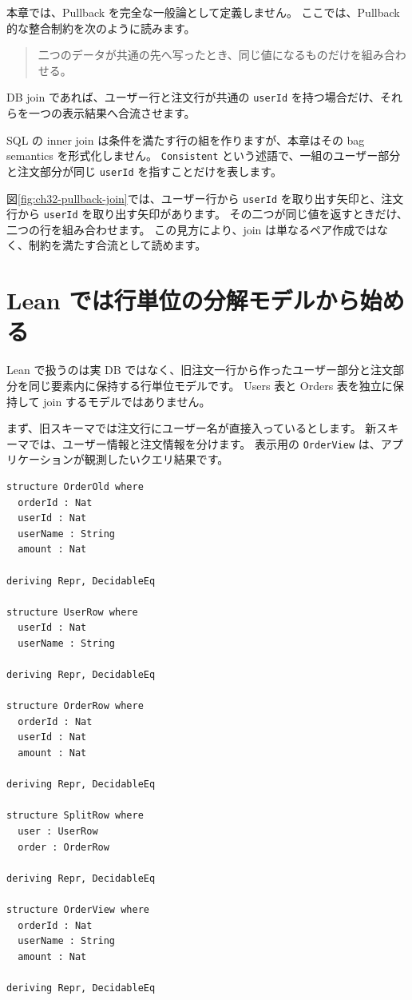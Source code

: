 本章では、Pullback を完全な一般論として定義しません。
ここでは、Pullback 的な整合制約を次のように読みます。
\begin{quote}
二つのデータが共通の先へ写ったとき、同じ値になるものだけを組み合わせる。
\end{quote}
DB join であれば、ユーザー行と注文行が共通の \texttt{userId} を持つ場合だけ、それらを一つの表示結果へ合流させます。

SQL の inner join は条件を満たす行の組を作りますが、本章はその bag semantics を形式化しません。
\texttt{Consistent} という述語で、一組のユーザー部分と注文部分が同じ \texttt{userId} を指すことだけを表します。


図\ref{fig:ch32-pullback-join}では、ユーザー行から \texttt{userId} を取り出す矢印と、注文行から \texttt{userId} を取り出す矢印があります。
その二つが同じ値を返すときだけ、二つの行を組み合わせます。
この見方により、join は単なるペア作成ではなく、制約を満たす合流として読めます。

\section{Lean では行単位の分解モデルから始める}

Lean で扱うのは実 DB ではなく、旧注文一行から作ったユーザー部分と注文部分を同じ要素内に保持する行単位モデルです。
Users 表と Orders 表を独立に保持して join するモデルではありません。

まず、旧スキーマでは注文行にユーザー名が直接入っているとします。
新スキーマでは、ユーザー情報と注文情報を分けます。
表示用の \texttt{OrderView} は、アプリケーションが観測したいクエリ結果です。

\begin{listing}[htbp]
\begin{verbatim}
structure OrderOld where
  orderId : Nat
  userId : Nat
  userName : String
  amount : Nat

deriving Repr, DecidableEq

structure UserRow where
  userId : Nat
  userName : String

deriving Repr, DecidableEq

structure OrderRow where
  orderId : Nat
  userId : Nat
  amount : Nat

deriving Repr, DecidableEq

structure SplitRow where
  user : UserRow
  order : OrderRow

deriving Repr, DecidableEq

structure OrderView where
  orderId : Nat
  userName : String
  amount : Nat

deriving Repr, DecidableEq
\end{verbatim}
\caption{\texttt{OrderOld}・\texttt{SplitRow}・\texttt{OrderView}}
\label{lst:ch32-schema-model}
\end{listing}

